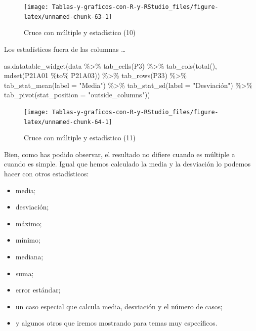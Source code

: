 \documentclass[
]{book}
\newenvironment{Shaded}{\begin{snugshade}}{\end{snugshade}}
\newcommand{\AttributeTok}[1]{\textcolor[rgb]{0.77,0.63,0.00}{#1}}
\newcommand{\FunctionTok}[1]{\textcolor[rgb]{0.00,0.00,0.00}{#1}}
\newcommand{\NormalTok}[1]{#1}
\newcommand{\SpecialCharTok}[1]{\textcolor[rgb]{0.00,0.00,0.00}{#1}}
\newcommand{\StringTok}[1]{\textcolor[rgb]{0.31,0.60,0.02}{#1}}
\providecommand{\tightlist}{%
  \setlength{\itemsep}{0pt}\setlength{\parskip}{0pt}}
\begin{document}
\begin{figure}[H]

{\centering \texttt{[image: Tablas-y-graficos-con-R-y-RStudio\_files/figure-latex/unnamed-chunk-63-1]} 

}

\caption{Cruce con múltiple y estadístico (10)}\label{fig:unnamed-chunk-63}
\end{figure}

Los estadísticos fuera de las columnas \ldots{}

\begin{Shaded}
\begin{Highlighting}[]
\FunctionTok{as.datatable\_widget}\NormalTok{(data }\SpecialCharTok{\%\textgreater{}\%}
  \FunctionTok{tab\_cells}\NormalTok{(P3) }\SpecialCharTok{\%\textgreater{}\%}
  \FunctionTok{tab\_cols}\NormalTok{(}\FunctionTok{total}\NormalTok{(), }\FunctionTok{mdset}\NormalTok{(P21A01 }\SpecialCharTok{\%to\%}\NormalTok{ P21A03)) }\SpecialCharTok{\%\textgreater{}\%}
  \FunctionTok{tab\_rows}\NormalTok{(P33) }\SpecialCharTok{\%\textgreater{}\%}
  \FunctionTok{tab\_stat\_mean}\NormalTok{(}\AttributeTok{label =} \StringTok{"Media"}\NormalTok{) }\SpecialCharTok{\%\textgreater{}\%}
  \FunctionTok{tab\_stat\_sd}\NormalTok{(}\AttributeTok{label =} \StringTok{"Desviación"}\NormalTok{) }\SpecialCharTok{\%\textgreater{}\%}
  \FunctionTok{tab\_pivot}\NormalTok{(}\AttributeTok{stat\_position =} \StringTok{"outside\_columns"}\NormalTok{))}
\end{Highlighting}
\end{Shaded}

\begin{figure}[H]

{\centering \texttt{[image: Tablas-y-graficos-con-R-y-RStudio\_files/figure-latex/unnamed-chunk-64-1]} 

}

\caption{Cruce con múltiple y estadístico (11)}\label{fig:unnamed-chunk-64}
\end{figure}

Bien, como has podido observar, el resultado no difiere cuando es múltiple a cuando es simple. Igual que hemos calculado la media y la desviación lo podemos hacer con otros estadísticos:

\begin{itemize}
\tightlist
\item
  media;
\item
  desviación;
\item
  máximo;
\item
  mínimo;
\item
  mediana;
\item
  suma;
\item
  error estándar;
\item
  un caso especial que calcula media, desviación y el número de casos;
\item
  y algunos otros que iremos mostrando para temas muy específicos.
\end{itemize}
\end{document}
